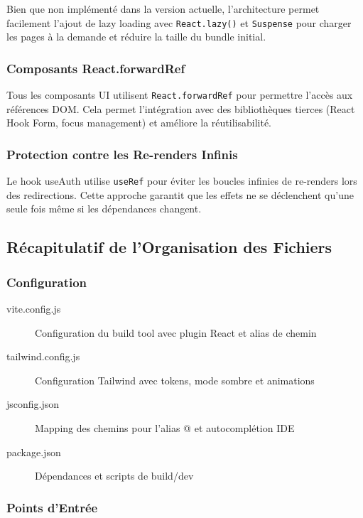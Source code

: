 Bien que non implémenté dans la version actuelle, l'architecture permet facilement l'ajout de lazy loading avec \texttt{React.lazy()} et \texttt{Suspense} pour charger les pages à la demande et réduire la taille du bundle initial.

\subsubsection{Composants React.forwardRef}

Tous les composants UI utilisent \texttt{React.forwardRef} pour permettre l'accès aux références DOM. Cela permet l'intégration avec des bibliothèques tierces (React Hook Form, focus management) et améliore la réutilisabilité.

\subsubsection{Protection contre les Re-renders Infinis}

Le hook useAuth utilise \texttt{useRef} pour éviter les boucles infinies de re-renders lors des redirections. Cette approche garantit que les effets ne se déclenchent qu'une seule fois même si les dépendances changent.

\subsection{Récapitulatif de l'Organisation des Fichiers}

\subsubsection{Configuration}

\begin{description}
    \item[vite.config.js] Configuration du build tool avec plugin React et alias de chemin
    \item[tailwind.config.js] Configuration Tailwind avec tokens, mode sombre et animations
    \item[jsconfig.json] Mapping des chemins pour l'alias @ et autocomplétion IDE
    \item[package.json] Dépendances et scripts de build/dev
\end{description}

\subsubsection{Points d'Entrée}

